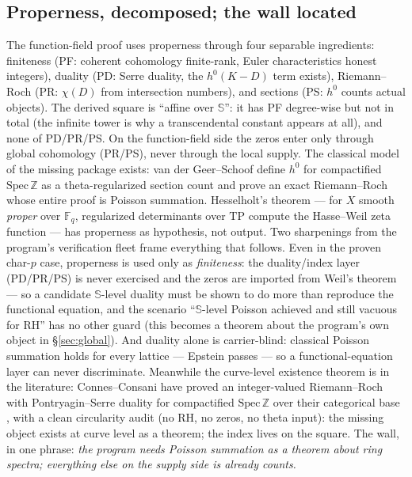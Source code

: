 \documentclass[11pt,reqno]{amsart}
\theoremstyle{plain}
\theoremstyle{definition}
\theoremstyle{remark}
\newcommand{\Z}{\mathbb{Z}}
\newcommand{\F}{\mathbb{F}}
\newcommand{\Sph}{\mathbb{S}}
\newcommand{\TP}{\mathrm{TP}}
\begin{document}
\subsection{Properness, decomposed; the wall located}\label{subsec:properness}

The function-field proof uses properness through four separable ingredients: finiteness (PF:
coherent cohomology finite-rank, Euler characteristics honest integers), duality (PD: Serre
duality, the $h^0(K-D)$ term exists), Riemann--Roch (PR: $\chi(D)$ from intersection
numbers), and sections (PS: $h^0$ counts actual objects). The derived square is ``affine over
$\Sph$'': it has PF degree-wise but not in total (the infinite tower is why a transcendental
constant appears at all), and none of PD/PR/PS. On the function-field side the zeros enter
only through global cohomology (PR/PS), never through the local supply. The classical model
of the missing package exists: van der Geer--Schoof \cite{vdGS} define $h^0$ for compactified
$\mathrm{Spec}\,\Z$ as a theta-regularized section count and prove an exact Riemann--Roch
whose entire proof is Poisson summation. Hesselholt's theorem \cite{Hesselholt16} --- for
$X$ smooth \emph{proper} over $\F_q$, regularized determinants over $\TP$ compute the
Hasse--Weil zeta function --- has properness as hypothesis, not output. Two sharpenings
from the program's verification fleet frame everything that follows. Even in the proven
char-$p$ case, properness is used only as \emph{finiteness}: the duality/index layer
(PD/PR/PS) is never exercised and the zeros are imported from Weil's theorem --- so a
candidate $\Sph$-level duality must be shown to do more than reproduce the functional
equation, and the scenario ``$\Sph$-level Poisson achieved and still vacuous for RH'' has
no other guard (this becomes a theorem about the program's own object in
\S\ref{sec:global}). And duality alone is carrier-blind: classical Poisson summation holds
for every lattice --- Epstein passes --- so a functional-equation layer can never
discriminate. Meanwhile the curve-level existence theorem is in the literature:
Connes--Consani have proved an integer-valued Riemann--Roch with Pontryagin--Serre duality
for compactified $\mathrm{Spec}\,\Z$ over their categorical base \cite{CCRR22,CCRR23},
with a clean circularity audit (no RH, no zeros, no theta input): the missing object exists
at curve level as a theorem; the index lives on the square. The wall, in one phrase:
\emph{the program needs Poisson summation as a theorem about ring spectra; everything else
on the supply side is already counts.}
\end{document}
